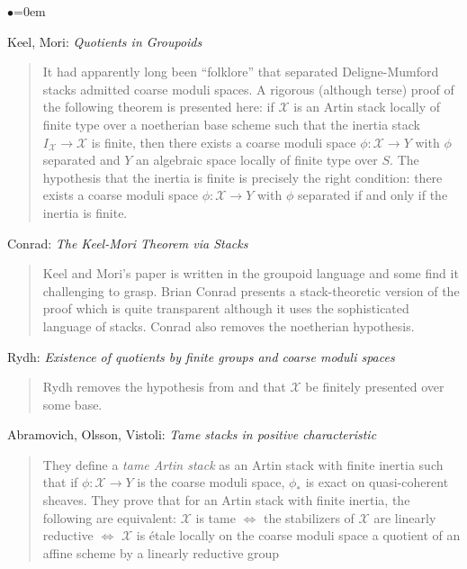 \begin{list}{$\bullet$}{\leftmargin=0em}
\item Keel, Mori: \emph{Quotients in Groupoids} \cite{keel-mori}
\begin{quote}
It had apparently long been ``folklore'' that separated Deligne-Mumford stacks 
admitted coarse moduli spaces. A rigorous (although terse) proof of the 
following theorem is presented here: if $\mathcal{X}$ is an Artin stack 
locally of 
finite type over a noetherian base scheme such that the inertia stack 
$I_{\mathcal{X}} 
\to \mathcal{X}$ is finite, then there exists a coarse moduli space $\phi: 
\mathcal{X} \to Y$ 
with $\phi$ separated and $Y$ an algebraic space locally of finite type over 
$S$. The hypothesis that the inertia is finite is precisely the right 
condition: there exists a coarse moduli space $\phi: \mathcal{X} \to Y$ with 
$\phi$ 
separated if and only if the inertia is finite. 
\end{quote}
\smallskip
\item Conrad: \emph{The Keel-Mori Theorem via Stacks} \cite{conrad} 
\begin{quote}
Keel and Mori's paper \cite{keel-mori} is written in the groupoid language and 
some find it challenging to grasp. Brian Conrad presents a stack-theoretic 
version of the proof which is quite transparent although it uses the 
sophisticated language of stacks. Conrad also removes the noetherian 
hypothesis.
\end{quote}
\smallskip
\item Rydh: \emph{Existence of quotients by finite groups and coarse moduli
spaces} \cite{rydh_quotients}
\begin{quote}
Rydh removes the hypothesis from \cite{keel-mori} and \cite{conrad} that 
$\mathcal{X}$ 
be finitely presented over some base. 
\end{quote}
\smallskip
\item
Abramovich, Olsson, Vistoli: \emph{Tame stacks in positive characteristic} 
\cite{tame}
\begin{quote}
They define a \emph{tame Artin stack} as an Artin stack with finite inertia 
such that if $\phi: \mathcal{X} \to Y$ is the coarse moduli space, $\phi_*$ is 
exact 
on quasi-coherent sheaves. They prove that for an Artin stack with finite 
inertia, the following are equivalent: $\mathcal{X}$ is tame $\iff$ the 
stabilizers of 
$\mathcal{X}$ are linearly reductive $\iff$ $\mathcal{X}$ is \'etale locally on 
the coarse 
moduli space a quotient of an affine scheme by a linearly reductive group 

\end{quote}
\end{list}
